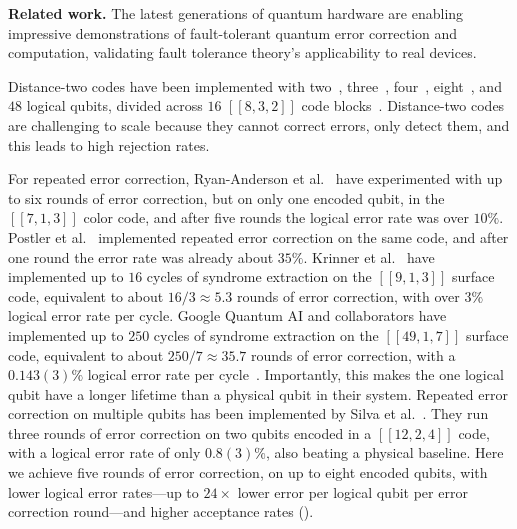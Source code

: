 \documentclass[10pt, twocolumn, aps, nofootinbib, longbibliography, nobibnotes, superscriptaddress]{revtex4-1} %
\begin{document}

\medskip
\noindent
\textbf{Related work.}
The latest generations of quantum hardware are enabling impressive demonstrations of fault-tolerant quantum error correction and computation, validating fault tolerance theory's applicability to real devices.  

Distance-two codes have been implemented with two~\cite{GuptaIBM24magiccz}, three~\cite{MenendezRayVasmer23colorcode832, Wang23color832addition}, four~\cite{Yamamoto23phaseestimattionerrordetection}, eight~\cite{self22icebergcode}, and $48$ logical qubits, divided across $16$ $[[8,3,2]]$ code blocks~\cite{BluvsteinHarvard23neutralatoms}.  Distance-two codes are challenging to scale because they cannot correct errors, only detect them, and this leads to high rejection rates.  

For repeated error correction, Ryan-Anderson et al.~\cite{honeywell21steane} have experimented with up to six rounds of error correction, but on only one encoded qubit, in the $[[7,1,3]]$ color code, and after five rounds the logical error rate was over $10\%$.  Postler et al.~\cite{Postler23steaneec} implemented repeated error correction on the same code, and after one round the error rate was already about $35\%$.  %
Krinner et al.~\cite{Krinner21repeatedsurfaceec} have implemented up to $16$ cycles of syndrome extraction on the $[[9,1,3]]$ surface code, equivalent to about $16/3 \approx 5.3$ rounds of error correction, with over $3\%$ logical error rate per cycle.  
Google Quantum AI and collaborators have implemented up to $250$ cycles of syndrome extraction on the $[[49,1,7]]$ surface code, equivalent to about $250 / 7 \approx 35.7$ rounds of error correction, with a $0.143(3)\%$ logical error rate per cycle~\cite{google23surface, google24surfacecode}.  Importantly, this makes the one logical qubit have a longer lifetime than a physical qubit in their system.  
Repeated error correction on multiple qubits has been implemented by Silva et al.~\cite{Silva24microsoft12qubitcode}.  They run three rounds of error correction on two qubits encoded in a $[[12,2,4]]$ code, with a logical error rate of only $0.8(3)\%$, also beating a physical baseline.  %
Here we achieve five rounds of error correction, on up to eight encoded qubits, with lower logical error rates---up to $24 \times$ lower error per logical qubit per error correction round---and higher acceptance rates ().  
\end{document}
